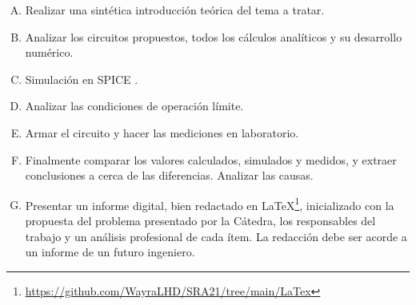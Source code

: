 

\begin{enumerate}[A.]
\item Realizar una sintética introducción teórica del tema a tratar.
\item Analizar los circuitos propuestos, todos los cálculos analíticos y su desarrollo numérico.
\item Simulación en SPICE .
\item Analizar las condiciones de operación límite.
\item Armar el circuito y hacer las mediciones en laboratorio.
\item Finalmente comparar los valores calculados, simulados y medidos, y extraer conclusiones a cerca de las diferencias. Analizar las causas.
\item Presentar un informe digital, bien redactado en \LaTeX \footnote{\href{https://github.com/WayraLHD/SRA21/tree/main/LaTex}{https://github.com/WayraLHD/SRA21/tree/main/LaTex}}, inicializado con la propuesta del problema presentado por la Cátedra, los responsables del trabajo y un análisis profesional de cada ítem. La redacción debe ser acorde a un informe de un futuro ingeniero.
\end{enumerate}